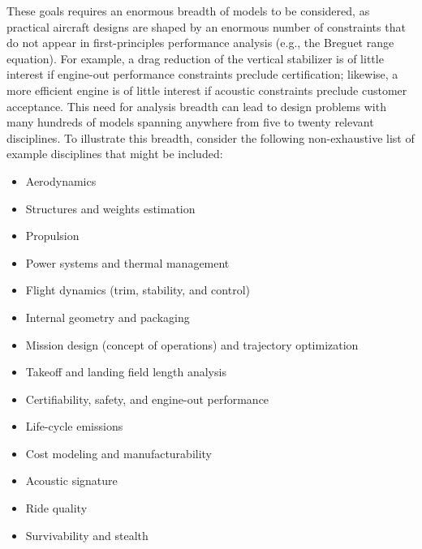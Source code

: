 \documentclass[12pt,vi,oneside]{report}
\begin{document}
    These goals requires an enormous breadth of models to be considered, as practical aircraft designs are shaped by an enormous number of constraints that do not appear in first-principles performance analysis (e.g., the Breguet range equation). For example, a drag reduction of the vertical stabilizer is of little interest if engine-out performance constraints preclude certification; likewise, a more efficient engine is of little interest if acoustic constraints preclude customer acceptance. This need for analysis breadth can lead to design problems with many hundreds of models spanning anywhere from five to twenty relevant disciplines. To illustrate this breadth, consider the following non-exhaustive list of example disciplines that might be included:

    \begin{multicols}{2}
        \begin{itemize}[noitemsep]
            \item Aerodynamics
            \item Structures and weights estimation
            \item Propulsion
            \item Power systems and thermal management
            \item Flight dynamics (trim, stability, and control)
            \item Internal geometry and packaging
            \item Mission design (concept of operations) and trajectory optimization
            \item Takeoff and landing field length analysis
            \item Certifiability, safety, and engine-out performance
            \item Life-cycle emissions
            \item Cost modeling and manufacturability
            \item Acoustic signature
            \item Ride quality
            \item Survivability and stealth
        \end{itemize}
    \end{multicols}
\end{document}

